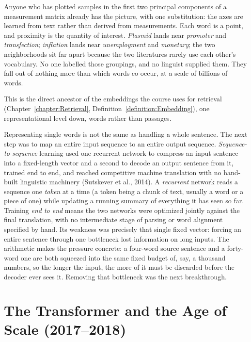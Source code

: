 \begin{example}
Anyone who has plotted samples in the first two principal components of a measurement matrix already has the picture, with one substitution: the axes are learned from text rather than derived from measurements.
Each word is a point, and proximity is the quantity of interest.
\emph{Plasmid} lands near \emph{promoter} and \emph{transfection}; \emph{inflation} lands near \emph{unemployment} and \emph{monetary}; the two neighborhoods sit far apart because the two literatures rarely use each other's vocabulary.
No one labelled those groupings, and no linguist supplied them.
They fall out of nothing more than which words co-occur, at a scale of billions of words.
\end{example}

This is the direct ancestor of the embeddings the course uses for retrieval (Chapter~\ref{chapter:Retrieval}, Definition~\ref{definition:Embedding}), one representational level down, words rather than passages.

Representing single words is not the same as handling a whole sentence.
The next step was to map an entire input sequence to an entire output sequence.
\emph{Sequence-to-sequence} learning used one recurrent network to compress an input sentence into a fixed-length vector and a second to decode an output sentence from it, trained end to end, and reached competitive machine translation with no hand-built linguistic machinery (Sutskever et al., 2014).
A \emph{recurrent} network reads a sequence one \emph{token} at a time (a token being a chunk of text, usually a word or a piece of one) while updating a running summary of everything it has seen so far.
Training \emph{end to end} means the two networks were optimized jointly against the final translation, with no intermediate stage of parsing or word alignment specified by hand.
Its weakness was precisely that single fixed vector: forcing an entire sentence through one bottleneck lost information on long inputs.
The arithmetic makes the pressure concrete: a four-word source sentence and a forty-word one are both squeezed into the same fixed budget of, say, a thousand numbers, so the longer the input, the more of it must be discarded before the decoder ever sees it.
Removing that bottleneck was the next breakthrough.

\section{The Transformer and the Age of Scale (2017--2018)}
\label{section:TransformerEra}

